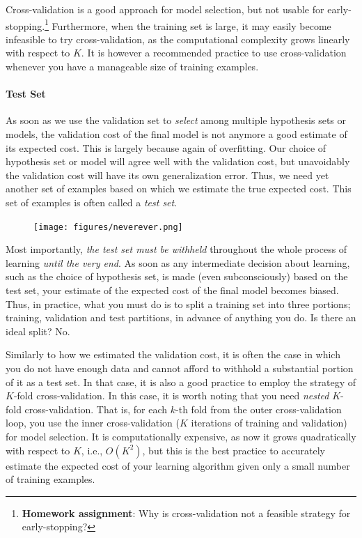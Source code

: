\documentclass{report}
\begin{document}
Cross-validation is a good approach for model selection, but not usable for
early-stopping.\footnote{
    {\bf Homework assignment}: Why is cross-validation not a feasible strategy
    for early-stopping? 
} Furthermore, when the training set is large, it may easily become infeasible
to try cross-validation, as the computational complexity grows linearly with
respect to $K$. It is however a recommended practice to use cross-validation
whenever you have a manageable size of training examples.

\paragraph{Test Set}

As soon as we use the validation set to {\it select} among multiple hypothesis
sets or models, the validation cost of the final model is not anymore a good
estimate of its expected cost. This is largely because again of overfitting. Our
choice of hypothesis set or model will agree well with the validation cost, but
unavoidably the validation cost will have its own generalization error. Thus, we
need yet another set of examples based on which we estimate the true expected
cost. This set of examples is often called a {\it test set}. 

\begin{figure}[t]
    \centering
    \texttt{[image: figures/neverever.png]}
\end{figure}

Most importantly, {\it the test set must be withheld} throughout the whole
process of learning {\it until the very end}.  As soon as any intermediate
decision about learning, such as the choice of hypothesis set, is made (even
subconsciously) based on the test set, your estimate of the expected cost of the
final model becomes biased. Thus, in practice, what you must do is to split a
training set into three portions; training, validation and test partitions, in
advance of anything you do. Is there an ideal split? No.

Similarly to how we estimated the validation cost, it is often the case in which
you do not have enough data and cannot afford to withhold a substantial portion
of it as a test set. In that case, it is also a good practice to employ the
strategy of $K$-fold cross-validation. In this case, it is worth noting that you
need {\it nested} $K$-fold cross-validation. That is, for each $k$-th fold from
the outer cross-validation loop, you use the inner cross-validation ($K$
iterations of training and validation) for model selection. It is
computationally expensive, as now it grows quadratically with respect to $K$,
i.e., $O(K^2)$, but this is the best practice to accurately estimate the
expected cost of your learning algorithm given only a small number of training
examples. 
\end{document}
